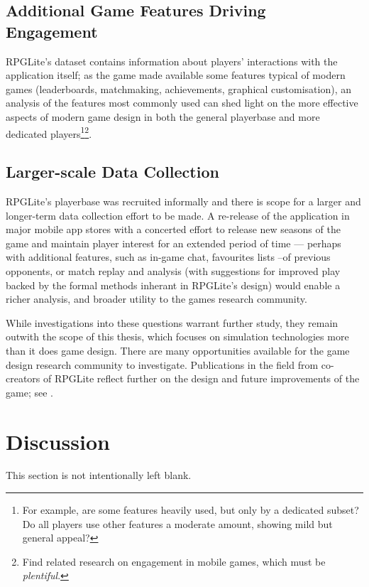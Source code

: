 \subsection{Additional Game Features Driving Engagement}
RPGLite's dataset contains information about players' interactions with the
application itself; as the game made available some features typical of modern
games (leaderboards, matchmaking, achievements, graphical customisation), an
analysis of the features most commonly used can shed light on the more effective
aspects of modern game design in both the general playerbase and more dedicated
players\footnote{For example, are some features heavily used, but only by a
dedicated subset? Do all players use other features a moderate amount, showing
mild but general appeal?}\footnote{Find related research on engagement in mobile
games, which must be \emph{plentiful}.}.
    

\subsection{Larger-scale Data Collection}
RPGLite's playerbase was recruited informally and there is scope for a larger
and longer-term data collection effort to be made. A re-release of the
application in major mobile app stores with a concerted effort to release new
seasons of the game and maintain player interest for an extended period of time
--- perhaps with additional features, such as in-game chat, favourites lists
--of previous opponents, or match replay and analysis (with suggestions for
improved play backed by the formal methods inherant in RPGLite's design) would
enable a richer analysis, and broader utility to the games research community.

While investigations into these questions warrant further study, they remain
outwith the scope of this thesis, which focuses on simulation technologies more
than it does game design. There are many opportunities available for the game
design research community to investigate. Publications in the field from
co-creators of RPGLite reflect further on the design and future improvements of
the game; see .


\section{Discussion}\label{sec:future_work_conclusion}

This section is not intentionally left blank.

